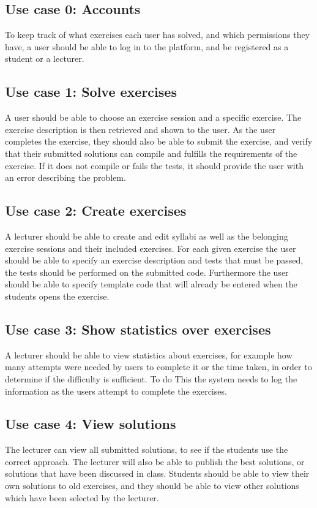 \subsection*{Use case 0: Accounts}
To keep track of what exercises each user has solved, and which permissions they have, a user should be able to log in to the platform, and be registered as a student or a lecturer.

\subsection*{Use case 1: Solve exercises}
A user should be able to choose an exercise session and a specific exercise. The exercise description is then retrieved and shown to the user.
As the user completes the exercise, they should also be able to submit the exercise, and verify that their submitted solutions can compile and fulfills the requirements of the exercise. If it does not compile or fails the tests, it should provide the user with an error describing the problem. 

\subsection*{Use case 2: Create exercises}
A lecturer should be able to create and edit syllabi as well as the belonging exercise sessions and their included exercises. 
For each given exercise the user should be able to specify an exercise description and tests that must be passed, the tests should be performed on the submitted code. Furthermore the user should be able to specify template code that will already be entered when the students opens the exercise.

\subsection*{Use case 3: Show statistics over exercises}
A lecturer should be able to view statistics about exercises, for example how many attempts were needed by users to complete it or the time taken, in order to determine if the difficulty is sufficient. To do This the system needs to log the information as the users attempt to complete the exercises.


\subsection*{Use case 4: View solutions}
The lecturer can view all submitted solutions, to see if the students use the correct approach. The lecturer will also be able to publish the best solutions, or solutions that have been discussed in class.  
Students should be able to view their own solutions to old exercises, and they should be able to view other solutions which have been selected by the lecturer. 


